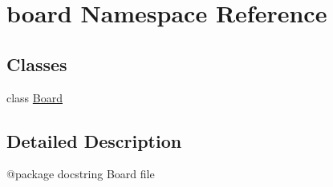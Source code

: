 \hypertarget{namespaceboard}{}\section{board Namespace Reference}
\label{namespaceboard}
\subsection*{Classes}
\begin{DoxyCompactItemize}
\item 
class \mbox{\hyperlink{classboard_1_1_board}{Board}}
\end{DoxyCompactItemize}


\subsection{Detailed Description}
\begin{DoxyVerb}@package docstring
 Board file\end{DoxyVerb}
 